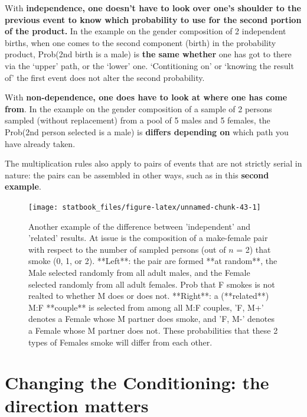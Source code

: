 \documentclass[]{book}
\begin{document}
With \textbf{independence, one doesn't have to look over one's shoulder to the previous event to know which probability to use for the second portion of the product.} In the example on the gender composition of 2 independent births, when one comes to the second component (birth) in the probability product, Prob(2nd birth is a male) is \textbf{the same whether} one has got to there via the `upper' path, or the `lower' one. `Contitioning on' or `knowing the result of' the first event does not alter the second probability.

With \textbf{non-dependence, one does have to look at where one has come from}. In the example on the gender composition of a sample of 2 persons sampled (without replacement) from a pool of 5 males and 5 females, the Prob(2nd person selected is a male) is \textbf{differs depending on} which path you have already taken.

The multiplication rules also apply to pairs of events that are not strictly serial in nature: the pairs can be assembled in other ways, such as in this \textbf{second example}.

\begin{figure}

{\centering \texttt{[image: statbook\_files/figure-latex/unnamed-chunk-43-1]} 

}

\caption{Another example of the difference between 'independent' and 'related' results. At issue is the composition of a make-female pair with respect to the number of sampled persons (out of $n$ = 2) that smoke (0, 1, or 2). **Left**: the pair are formed **at random**, the Male selected randomly from all adult males, and the Female selected randomly from all adult females. Prob that F smokes is not realted to whether M does or does not. **Right**: a (**related**) M:F **couple** is selected from among all M:F couples,  'F, M+' denotes a Female whose M partner does smoke, and 'F, M-' denotes a Female whose M partner does not. These probabilities that these 2 types of Females smoke will differ from each other.}\label{fig:unnamed-chunk-43}
\end{figure}

\hypertarget{changing-the-conditioning-the-direction-matters}{%
\section{Changing the Conditioning: the direction matters}\label{changing-the-conditioning-the-direction-matters}}
\end{document}
